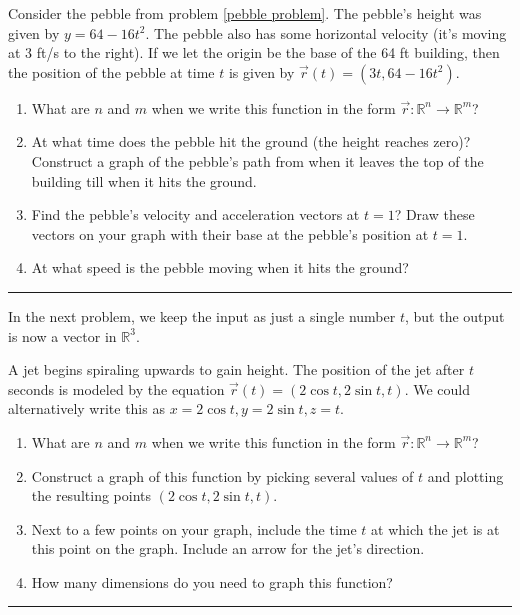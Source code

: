 \begin{problem}%
%
Consider the pebble from problem \ref{pebble problem}. The pebble's height was given by $y=64-16t^2$.  The pebble also has some horizontal velocity (it's moving at 3 ft/s to the right).  If we let the origin be the base of the 64 ft building, then the position of the pebble at time $t$ is given by $\vec r(t) = (3t, 64-16t^2)$.
 \begin{enumerate}
  \item What are $n$ and $m$ when we write this function in the form  $\vec r:{\mathbb{R}}^n\to {\mathbb{R}}^m$?
  \item At what time does the pebble hit the ground (the height reaches zero)?  Construct a graph of the pebble's path from when it leaves the top of the building till when it hits the ground.
  \item Find the pebble's velocity and acceleration vectors at $t=1$? Draw these vectors on your graph with their base at the pebble's position at $t=1$. 
  \item At what speed is the pebble moving when it hits the ground?
 \end{enumerate}
\hrule\end{problem}

In the next problem, we keep the input as just a single number $t$, but the output is now a vector in $\mathbb{R}^3$.

\begin{problem}%
\label{space curve example}%
%
 A jet begins spiraling upwards to gain height. The position of the jet after $t$ seconds is modeled by the equation 
$\vec r(t)=(2\cos t, 2\sin t, t).$ We could alternatively write this as $x=2\cos t, y=2\sin t, z=t$. 
\begin{enumerate}
 \item What are $n$ and $m$ when we write this function in the form  $\vec r:{\mathbb{R}}^n\to {\mathbb{R}}^m$? 
 \item Construct a graph of this function by picking several values of $t$ and plotting the resulting points $(2\cos t, 2\sin t, t)$. 
 \item Next to a few points on your graph, include the time $t$ at which the jet is at this point on the graph. Include an arrow for the jet's direction.
 \item  How many dimensions do you need to graph this function?
\end{enumerate}
\hrule\end{problem}

